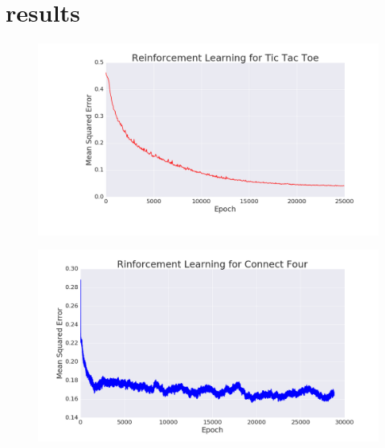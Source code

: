 \section{results}

\begin{frame}
\begin{figure}
\includegraphics[width=1 \textwidth]{reinforcement_ttt}
\end{figure}
\end{frame}

\begin{frame}
\begin{figure}
\includegraphics[width=1 \textwidth]{reinforcement_c4}
\end{figure}
\end{frame}

